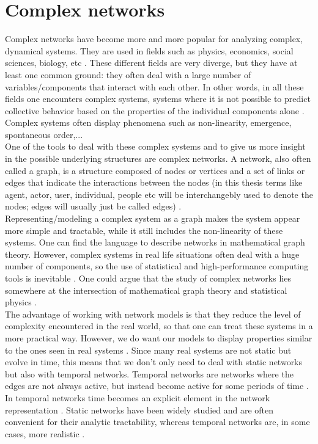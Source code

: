 \documentclass[11 pt , letterpaper , twoside , openright]{book}
\begin{document}
\section{Complex networks}

Complex networks have become more and more popular for analyzing complex, dynamical systems. They are used in fields such as physics, economics, social sciences, biology, etc \cite{Costa2008}. These different fields are very diverge, but they have at least one common ground: they often deal with a large number of variables/components that interact with each other. In other words, in all these fields one encounters complex systems, systems where it is not possible to predict collective behavior based on the properties of the individual components alone \cite{Mata2020}. Complex systems often display phenomena such as non-linearity, emergence, spontaneous order,... %
\\
\newline
One of the tools to deal with these complex systems and to give us more insight in the possible underlying structures are complex networks. A network, also often called a graph, is a structure composed of nodes or vertices and a set of links or edges that indicate the interactions between the nodes (in this thesis terms like agent, actor, user, individual, people etc will be interchangebly used to denote the nodes; edges will usually just be called edges) \cite{Mata2020}.\\
Representing/modeling a complex system as a graph makes the system appear more simple and tractable, while it still includes the non-linearity of these systems. One can find the language to describe networks in mathematical graph theory. However, complex systems in real life situations often deal with a huge number of components, so the use of statistical and high-performance computing tools is inevitable \cite{Mata2020}. One could argue that the study of complex networks lies somewhere at the intersection of mathematical graph theory and statistical physics \cite{F.Costa2007}.\\
The advantage of working with network models is that they reduce the level of complexity encountered in the real world, so that one can treat these systems in a more practical way. However, we do want our models to display properties similar to the ones seen in real systems \cite{Mata2020}. Since many real systems are not static but evolve in time, this means that we don't only need to deal with static networks but also with temporal networks. Temporal networks are networks where the edges are not always active, but instead become active for some periods of time \cite{Holme2012}. In temporal networks time becomes an explicit element in the network representation \cite{Holme2012}. Static networks have been widely studied and are often convenient for their analytic tractability, whereas temporal networks are, in some cases, more realistic \cite{Mata2020}.\\
\end{document}
